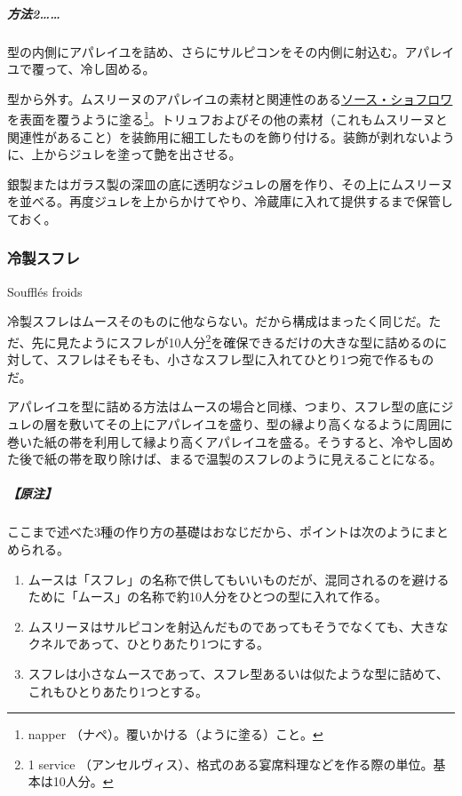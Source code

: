 \begin{recette}
\hypertarget{procede-deux-moulage-des-mousselines-froides}{%
\subparagraph{方法2\ldots{}\ldots{}}\label{procede-deux-moulage-des-mousselines-froides}}

型の内側にアパレイユを詰め、さらにサルピコンをその内側に射込む。アパレイユで覆って、冷し固める。

型から外す。ムスリーヌのアパレイユの素材と関連性のある\protect\hyperlink{sauce-chaud-froid-ordinaire}{ソース・ショフロワ}を表面を覆うように塗る\footnote{napper
  （ナペ）。覆いかける（ように塗る）こと。}。トリュフおよびその他の素材（これもムスリーヌと関連性があること）を装飾用に細工したものを飾り付ける。装飾が剥れないように、上からジュレを塗って艶を出させる。

銀製またはガラス製の深皿の底に透明なジュレの層を作り、その上にムスリーヌを並べる。再度ジュレを上からかけてやり、冷蔵庫に入れて提供するまで保管しておく。

\atoaki{}

\hypertarget{souffles-froids}{%
\subsubsection{冷製スフレ}\label{souffles-froids}}

\begin{frsubenv}

Soufflés froids

\end{frsubenv}


冷製スフレはムースそのものに他ならない。だから構成はまったく同じだ。ただ、先に見たようにスフレが10人分\footnote{1
  service
  （アンセルヴィス）、格式のある宴席料理などを作る際の単位。基本は10人分。}を確保できるだけの大きな型に詰めるのに対して、スフレはそもそも、小さなスフレ型に入れてひとり1つ宛で作るものだ。

アパレイユを型に詰める方法はムースの場合と同様、つまり、スフレ型の底にジュレの層を敷いてその上にアパレイユを盛り、型の縁より高くなるように周囲に巻いた紙の帯を利用して縁より高くアパレイユを盛る。そうすると、冷やし固めた後で紙の帯を取り除けば、まるで温製のスフレのように見えることになる。

\hypertarget{nota-souffles-froids}{%
\subparagraph{【原注】}\label{nota-souffles-froids}}

ここまで述べた3種の作り方の基礎はおなじだから、ポイントは次のようにまとめられる。

\begin{enumerate}
\def\labelenumi{\arabic{enumi}.}
\item
  ムースは「スフレ」の名称で供してもいいものだが、混同されるのを避けるために「ムース」の名称で約10人分をひとつの型に入れて作る。
\item
  ムスリーヌはサルピコンを射込んだものであってもそうでなくても、大きなクネルであって、ひとりあたり1つにする。
\item
  スフレは小さなムースであって、スフレ型あるいは似たような型に詰めて、これもひとりあたり1つとする。
\end{enumerate}

\end{recette}

